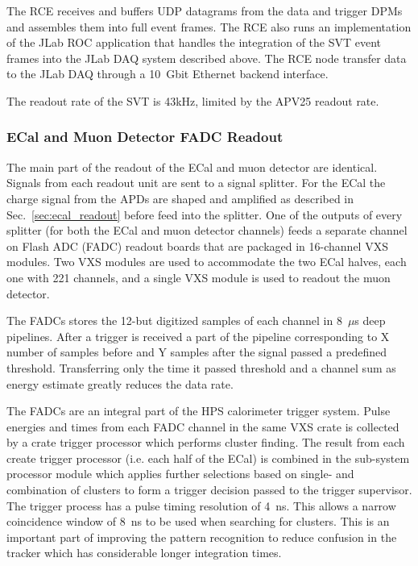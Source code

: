 The RCE receives and buffers UDP datagrams from the data and trigger DPMs and
 assembles them into full event frames. The RCE also runs an implementation of the JLab ROC application that handles the integration of the SVT event frames into the JLab DAQ 
 system described above. The RCE node transfer data to the JLab DAQ  
 through a 10~Gbit Ethernet backend interface. 

The readout rate of the SVT is 43kHz, limited by the APV25 readout rate. 







\subsubsection{ECal and Muon Detector FADC Readout}
\label{sec:fadc_daq}
The main part of the readout of the ECal and muon detector are identical. Signals from each 
readout unit are sent to a signal splitter. For the ECal the charge signal from the APDs are 
shaped and amplified as described in Sec.~\ref{sec:ecal_readout} before feed into the 
splitter. One of the outputs of every splitter (for both the ECal and muon detector channels) 
feeds a separate channel on Flash ADC (FADC) readout boards that are packaged in 
16-channel VXS modules. Two VXS modules are used to accommodate the two ECal 
halves, each one with 221 channels, and a single VXS module is used to readout the muon 
detector. 

The FADCs stores the 12-but digitized samples of each channel in 8~$\mu$s deep pipelines. 
After a trigger is received a part of the pipeline corresponding to X number of samples 
before and Y samples after the signal passed a predefined threshold. Transferring only 
the time it passed threshold and a channel sum as energy estimate greatly reduces the data rate. 


The FADCs are an integral part of the HPS calorimeter trigger system. Pulse energies 
and times from each FADC channel in the same VXS crate is collected by a crate trigger
 processor which performs cluster finding. The result from each create trigger processor (i.e. each half of 
the ECal) is combined in the sub-system processor module which applies further selections 
based on single- and combination of clusters to form a trigger decision passed to the trigger 
supervisor. The trigger process has a pulse timing resolution of 4~ns. This allows a narrow 
coincidence window of 8~ns to be used when searching for clusters. 
This is an important part of improving 
the pattern recognition to reduce confusion in the tracker which has considerable longer 
integration times. 





